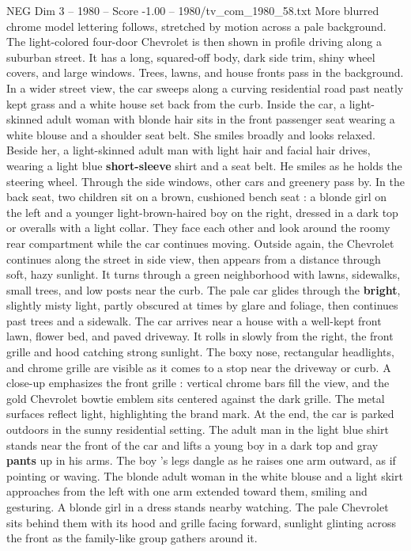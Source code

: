 \begin{textsample}{NEG Dim 3 – 1980 – Score -1.00 – 1980/tv\_com\_1980\_58.txt}
More blurred chrome model lettering follows, stretched by motion across a pale background.
The light-colored four-door Chevrolet is then shown in profile driving along a suburban street.
It has a long, squared-off body, dark side trim, shiny wheel covers, and large windows.
Trees, lawns, and house fronts pass in the background.
In a wider street view, the car sweeps along a curving residential road past neatly kept grass and a white house set back from the curb.
Inside the car, a light-skinned adult woman with blonde hair sits in the front passenger seat wearing a white blouse and a shoulder seat belt.
She smiles broadly and looks relaxed.
Beside her, a light-skinned adult man with light hair and facial hair drives, wearing a light blue \textbf{short-sleeve} shirt and a seat belt.
He smiles as he holds the steering wheel.
Through the side windows, other cars and greenery pass by.
In the back seat, two children sit on a brown, cushioned bench seat : a blonde girl on the left and a younger light-brown-haired boy on the right, dressed in a dark top or overalls with a light collar.
They face each other and look around the roomy rear compartment while the car continues moving.
Outside again, the Chevrolet continues along the street in side view, then appears from a distance through soft, hazy sunlight.
It turns through a green neighborhood with lawns, sidewalks, small trees, and low posts near the curb.
The pale car glides through the \textbf{bright}, slightly misty light, partly obscured at times by glare and foliage, then continues past trees and a sidewalk.
The car arrives near a house with a well-kept front lawn, flower bed, and paved driveway.
It rolls in slowly from the right, the front grille and hood catching strong sunlight.
The boxy nose, rectangular headlights, and chrome grille are visible as it comes to a stop near the driveway or curb.
A close-up emphasizes the front grille : vertical chrome bars fill the view, and the gold Chevrolet bowtie emblem sits centered against the dark grille.
The metal surfaces reflect light, highlighting the brand mark.
At the end, the car is parked outdoors in the sunny residential setting.
The adult man in the light blue shirt stands near the front of the car and lifts a young boy in a dark top and gray \textbf{pants} up in his arms.
The boy ’s legs dangle as he raises one arm outward, as if pointing or waving.
The blonde adult woman in the white blouse and a light skirt approaches from the left with one arm extended toward them, smiling and gesturing.
A blonde girl in a dress stands nearby watching.
The pale Chevrolet sits behind them with its hood and grille facing forward, sunlight glinting across the front as the family-like group gathers around it.

\end{textsample}
